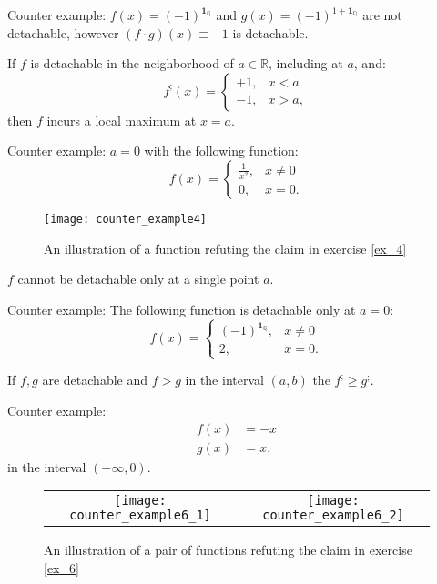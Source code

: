 \documentclass[11pt]{book}
\begin{document}
Counter example: $f\left(x\right)=\left(-1\right)^{\boldsymbol{1}_{\mathbb{Q}}}$
and $g\left(x\right)=\left(-1\right)^{1+\boldsymbol{1}_{\mathbb{Q}}}$
are not detachable, however $\left(f\cdot g\right)\left(x\right)\equiv-1$
is detachable.

\begin{exercise}\label{ex_4}If $f$ is detachable in the neighborhood of $a\in\mathbb{R}$,
including at $a$, and:
\[
f^{;}\left(x\right)=\begin{cases}
+1, & x<a\\
-1, & x>a,
\end{cases}
\]
then $f$ incurs a local maximum at $x=a$.
\end{exercise}

Counter example: $a=0$ with the following function:
\[
f\left(x\right)=\begin{cases}
\frac{1}{x^{2}}, & x\neq0\\
0, & x=0.
\end{cases}
\]

\begin{figure}[h!]
\texttt{[image: counter\_example4]}
\label{one_over_x_square}
\caption{An illustration of a function refuting the claim in exercise \ref{ex_4}}
\end{figure}

\begin{exercise}$f$ cannot be detachable only at a single point $a$.
\end{exercise}

Counter example: The following function is detachable only at $a=0$:
\[
f\left(x\right)=\begin{cases}
\left(-1\right)^{\boldsymbol{1}_{\mathbb{Q}}}, & x\neq0\\
2, & x=0.
\end{cases}
\]

\begin{exercise}\label{ex_6}If $f,g$ are detachable and $f>g$ in the interval $\left(a,b\right)$
the $f^{;}\geq g^{;}$.
\end{exercise}

Counter example:
\begin{align*}
f\left(x\right) & =-x\\
g\left(x\right) & =x,
\end{align*}
in the interval $\left(-\infty,0\right)$.
\begin{figure}[h!]
\begin{tabular}{cc}
  \texttt{[image: counter\_example6\_1]} &   \texttt{[image: counter\_example6\_2]} \\
\end{tabular}
\caption{An illustration of a pair of functions refuting the claim in exercise \ref{ex_6}}
\end{figure}
\end{document}
